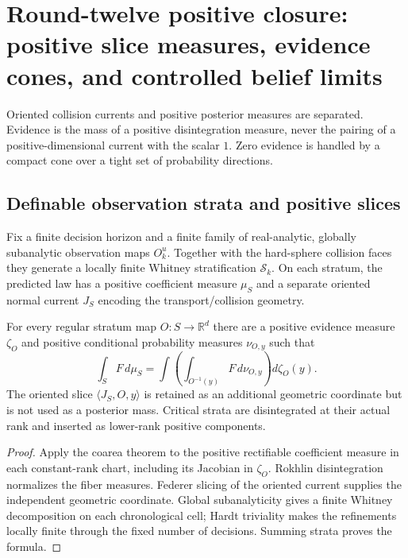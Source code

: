 \section{Round-twelve positive closure: positive slice measures, evidence cones, and controlled belief limits}
\label{sec:r12-c1}

Oriented collision currents and positive posterior measures are separated.
Evidence is the mass of a positive disintegration measure, never the pairing of
a positive-dimensional current with the scalar $1$.  Zero evidence is handled
by a compact cone over a tight set of probability directions.

\subsection{Definable observation strata and positive slices}

Fix a finite decision horizon and a finite family of real-analytic, globally
subanalytic observation maps $O_k^u$.  Together with the hard-sphere collision
faces they generate a locally finite Whitney stratification
$\mathscr S_k$.  On each stratum, the predicted law has a positive coefficient
measure $\mu_S$ and a separate oriented normal current $J_S$ encoding the
transport/collision geometry.

\begin{theorem}
\label{thm:r12-c1-slice}
For every regular stratum map $O:S\to\mathbb R^d$ there are a positive evidence
measure $\zeta_O$ and positive conditional probability measures
$\nu_{O,y}$ such that
\[
 \int_SF\,d\mu_S
 =\int\left(\int_{O^{-1}(y)}F\,d\nu_{O,y}\right)d\zeta_O(y).
\]
The oriented slice $\langle J_S,O,y\rangle$ is retained as an additional
geometric coordinate but is not used as a posterior mass.  Critical strata
are disintegrated at their actual rank and inserted as lower-rank positive
components.
\end{theorem}

\begin{proof}
Apply the coarea theorem to the positive rectifiable coefficient measure in
each constant-rank chart, including its Jacobian in $\zeta_O$.  Rokhlin
disintegration normalizes the fiber measures.  Federer slicing of the oriented
current supplies the independent geometric coordinate.  Global
subanalyticity gives a finite Whitney decomposition on each chronological
cell; Hardt triviality makes the refinements locally finite through the fixed
number of decisions.  Summing strata proves the formula.
\end{proof}

